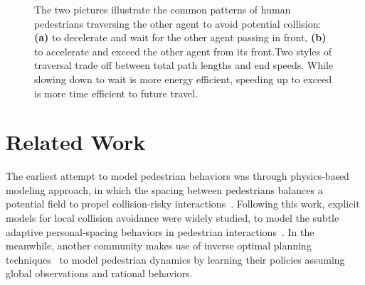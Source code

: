 \documentclass[conference]{IEEEtran}
\begin{document}
\begin{figure}[tb]
  \begin{center}
  \hspace*{-1em}
  \hspace*{-0.03em}
  \end{center}
  \vspace{-0.3em}
  \caption{The two pictures illustrate the common patterns of human 
    pedestrians traversing the other agent to avoid potential collision: {\bf (a)} to 
    decelerate and wait for the other agent passing in front, 
    {\bf (b)} to accelerate and exceed the other agent from its front.Two styles of traversal trade off between total path lengths and end speeds. While slowing down to wait is more energy efficient, speeding up to exceed is more time efficient to future travel. 
    }
\label{fig1}
\end{figure}

\section{Related Work}
\label{sec:related}
\vspace{-0.3em}
The earliest attempt to model pedestrian behaviors was through physics-based 
modeling approach, in which the spacing between pedestrians balances a 
potential field to propel collision-risky 
interactions~\cite{helbing1995social}. Following this work, explicit models 
for local collision avoidance were widely studied, to model the subtle 
adaptive personal-spacing behaviors in pedestrian 
interactions~\cite{papadakis2014adaptive}. In the meanwhile, another community 
makes use of inverse optimal planning 
techniques~\cite{ziebart2009planning,henry2010learning,vasquez2014inverse} to 
model pedestrian dynamics by learning their policies assuming global observations and 
rational behaviors.
\end{document}
